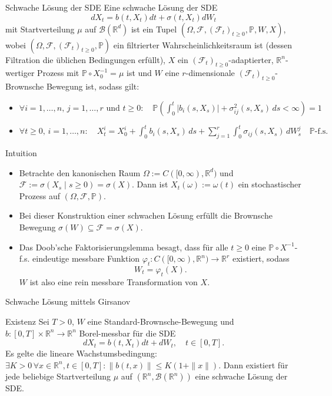 \documentclass[11pt,aspectratio=169]{beamer}
\begin{document}
\begin{frame}{Schwache Lösung der SDE}\small
  Eine schwache Lösung der SDE 
    \[
    dX_t = b(t,X_t) dt + \sigma(t,X_t) dW_t
    \]
    mit Startverteilung $\mu$ auf $\mathcal{B}(\mathbb{R}^d)$ ist ein Tupel $(\Omega, \mathcal{F}, (\mathcal{F}_t)_{t \geq 0}, \mathbb{P}, W, X)$, wobei $(\Omega, \mathcal{F}, (\mathcal{F}_t)_{t \geq 0}, \mathbb{P})$ ein filtrierter Wahrscheinlichkeitsraum ist (dessen Filtration die üblichen Bedingungen erfüllt), $X$ ein $(\mathcal{F}_t)_{t \geq 0}$-adaptierter, $\mathbb{R}^n$-wertiger Prozess mit $\mathbb{P} \circ X_0^{-1} = \mu$ ist und $W$ eine $r$-dimensionale $(\mathcal{F}_t)_{t \geq 0}$-Brownsche Bewegung ist, sodass gilt:
    \begin{itemize}
        \item $\forall i=1,\dots,n, \, j=1,\dots,r \text{ und } t \geq 0: \quad \mathbb{P}\left(\int_0^t |b_i(s,X_s)| + \sigma_{ij}^2(s,X_s) \, ds < \infty\right)=1$
        \item $\forall t \geq 0, \, i=1,\dots,n: \quad X_t^i = X_0^i + \int_0^t b_i(s,X_s) \, ds + \sum_{j=1}^r \int_0^t \sigma_{ij}(s,X_s) \, dW_s^j \quad \mathbb{P}\text{-f.s.}$
    \end{itemize}
\end{frame}

\begin{frame}{Intuition}
  \begin{itemize}
    \item Betrachte den kanonischen Raum $\Omega := C([0,\infty), \mathbb{R}^d)$ und $\mathcal{F} := \sigma(X_s \mid s \geq 0) = \sigma(X)$. Dann ist $X_t(\omega) := \omega(t)$ ein stochastischer Prozess auf $(\Omega,\mathcal{F},\mathbb{P})$. 
    \item Bei dieser Konstruktion einer schwachen Lösung erfüllt die Brownsche Bewegung $\sigma(W) \subseteq \mathcal{F} = \sigma(X)$. 
    \item Das Doob'sche Faktorisierungslemma besagt, dass für alle $t \geq 0$ eine $\mathbb{P} \circ X^{-1}$-f.s. eindeutige messbare Funktion $\varphi_t : C([0,\infty),\mathbb{R}^n) \to \mathbb{R}^r$ existiert, sodass 
    \[
    W_t = \varphi_t(X).
    \]
    $W$ ist also eine rein messbare Transformation von $X$.
  \end{itemize}
\end{frame}



\begin{frame}{Schwache Lösung mittels Girsanov}\small 

\begin{block}{Existenz}
Sei $T>0$, $W$ eine Standard-Brownsche-Bewegung und $b: [0,T] \times \mathbb{R}^n \to \mathbb{R}^n$ Borel-messbar für die SDE
\[
dX_t = b(t,X_t) dt + dW_t, \quad t \in [0,T].
\]
Es gelte die lineare Wachstumsbedingung: $\exists K > 0 \, \forall x \in \mathbb{R}^n, t \in [0,T]: \| b(t,x) \| \leq K(1 + \| x \|)$. Dann existiert für jede beliebige Startverteilung $\mu$ auf $(\mathbb{R}^n, \mathcal{B}(\mathbb{R}^n))$ eine schwache Lösung der SDE.
\end{block}
\end{frame}
\end{document}
